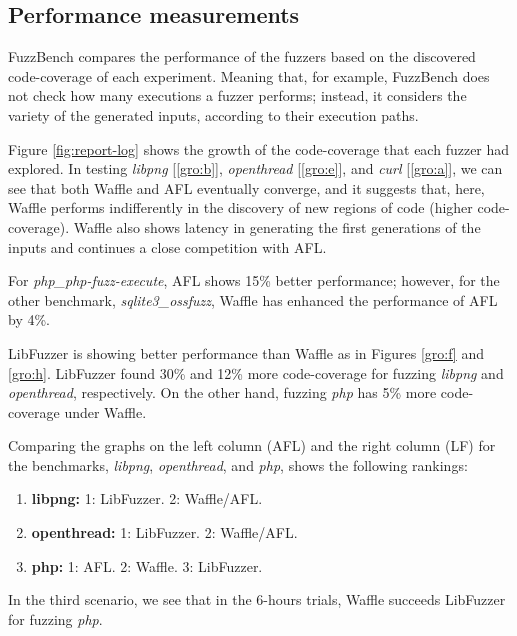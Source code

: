 \subsection*{Performance measurements}

FuzzBench compares the performance of the fuzzers based on the discovered code-coverage of each experiment. Meaning that, for example, FuzzBench does not check how many executions a fuzzer performs; instead, it considers the variety of the generated inputs, according to their execution paths. 

Figure \ref{fig:report-log} shows the growth of the code-coverage that each fuzzer had explored. In testing \textit{libpng} [\ref{gro:b}], \textit{openthread} [\ref{gro:e}], and \textit{curl} [\ref{gro:a}], we can see that both Waffle and AFL eventually converge, and it suggests that, here, Waffle performs indifferently in the discovery of new regions of code (higher code-coverage). Waffle also shows latency in generating the first generations of the inputs and continues a close competition with AFL.

For \textit{php\_php-fuzz-execute}, AFL shows 15\% better performance; however, for the other benchmark, \textit{sqlite3\_ossfuzz}, Waffle has enhanced the performance of AFL by 4\%.

LibFuzzer is showing better performance than Waffle as in Figures \ref{gro:f} and \ref{gro:h}. LibFuzzer found 30\% and 12\% more code-coverage for fuzzing \textit{libpng} and \textit{openthread}, respectively. On the other hand, fuzzing \textit{php} has 5\% more code-coverage under Waffle.

Comparing the graphs on the left column (AFL) and the right column (LF) for the benchmarks, \textit{libpng}, \textit{openthread}, and \textit{php}, shows the following rankings:

\begin{enumerate}
    \item \textbf{libpng:} 1: LibFuzzer. 2: Waffle/AFL.
    \item \textbf{openthread:} 1: LibFuzzer. 2: Waffle/AFL.
    \item \textbf{php:} 1: AFL. 2: Waffle. 3: LibFuzzer.
\end{enumerate}

In the third scenario, we see that in the 6-hours trials, Waffle succeeds LibFuzzer for fuzzing \textit{php}.

